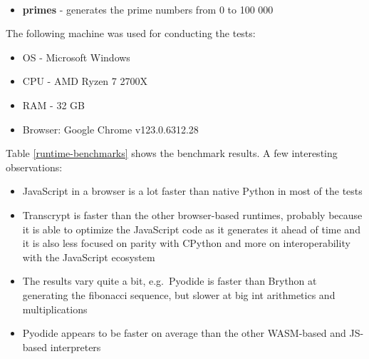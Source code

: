 \begin{Shaded}
\begin{Highlighting}[]
\OperatorTok{=}\NormalTok{):}
    \OperatorTok{\textless{}} \NormalTok{:}
\OperatorTok{=} \NormalTok{, }
    \NormalTok{ \_ }
\OperatorTok{=}\OperatorTok{+}\OperatorTok{\%} 
\end{Highlighting}
\end{Shaded}

\begin{itemize}
\tightlist
\item
  \textbf{primes} - generates the prime numbers from 0 to 100 000
\end{itemize}

The following machine was used for conducting the tests:

\begin{itemize}
\tightlist
\item
  OS - Microsoft Windows
\item
  CPU - AMD Ryzen 7 2700X
\item
  RAM - 32 GB
\item
  Browser: Google Chrome v123.0.6312.28
\end{itemize}

Table \ref{runtime-benchmarks} shows the benchmark results. A few interesting observations:

\begin{itemize}
\tightlist
\item
  JavaScript in a browser is a lot faster than native Python in most of the tests
\item
  Transcrypt is faster than the other browser-based runtimes, probably because it is able to optimize the JavaScript code as it generates it ahead of time and it is also less focused on parity with CPython and more on interoperability with the JavaScript ecosystem
\item
  The results vary quite a bit, e.g.~Pyodide is faster than Brython at generating the fibonacci sequence, but slower at big int arithmetics and multiplications
\item
  Pyodide appears to be faster on average than the other WASM-based and JS-based interpreters
\end{itemize}

